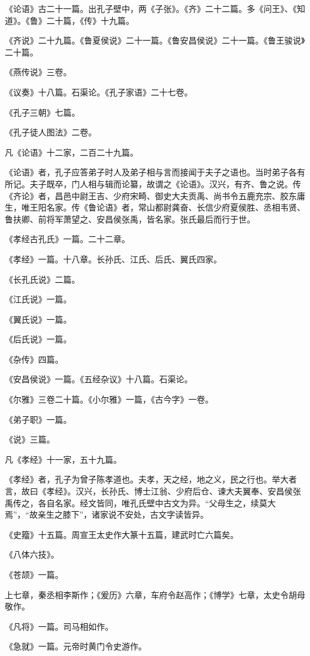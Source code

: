 \documentclass[]{article}
\begin{document}
《论语》古二十一篇。出孔子壁中，两《子张》。《齐》二十二篇。多《问王》、《知道》。《鲁》二十篇，《传》十九篇。

《齐说》二十九篇。《鲁夏侯说》二十一篇。《鲁安昌侯说》二十一篇。《鲁王骏说》二十篇。

《燕传说》三卷。

《议奏》十八篇。石渠论。《孔子家语》二十七卷。

《孔子三朝》七篇。

《孔子徒人图法》二卷。

凡《论语》十二家，二百二十九篇。

《论语》者，孔子应答弟子时人及弟子相与言而接闻于夫子之语也。当时弟子各有所记。夫子既卒，门人相与辑而论纂，故谓之《论语》。汉兴，有齐、鲁之说。传《齐论》者，昌邑中尉王吉、少府宋畸、御史大夫贡禹、尚书令五鹿充宗、胶东庸生，唯王阳名家。传《鲁论语》者，常山都尉龚奋、长信少府夏侯胜、丞相韦贤、鲁扶卿、前将军萧望之、安昌侯张禹，皆名家。张氏最后而行于世。

《孝经古孔氏》一篇。二十二章。

《孝经》一篇。十八章。长孙氏、江氏、后氏、翼氏四家。

《长孔氏说》二篇。

《江氏说》一篇。

《翼氏说》一篇。

《后氏说》一篇。

《杂传》四篇。

《安昌侯说》一篇。《五经杂议》十八篇。石渠论。

《尔雅》三卷二十篇。《小尔雅》一篇，《古今字》一卷。

《弟子职》一篇。

《说》三篇。

凡《孝经》十一家，五十九篇。

《孝经》者，孔子为曾子陈孝道也。夫孝，天之经，地之义，民之行也。举大者言，故曰《孝经》。汉兴，长孙氏、博士江翁、少府后仓、谏大夫翼奉、安昌侯张禹传之，各自名家。经文皆同，唯孔氏壁中古文为异。``父母生之，续莫大焉''，``故亲生之膝下''，诸家说不安处，古文字读皆异。

《史籀》十五篇。周宣王太史作大篆十五篇，建武时亡六篇矣。

《八体六技》。

《苍颉》一篇。

上七章，秦丞相李斯作；《爰历》六章，车府令赵高作；《博学》七章，太史令胡母敬作。

《凡将》一篇。司马相如作。

《急就》一篇。元帝时黄门令史游作。
\end{document}
